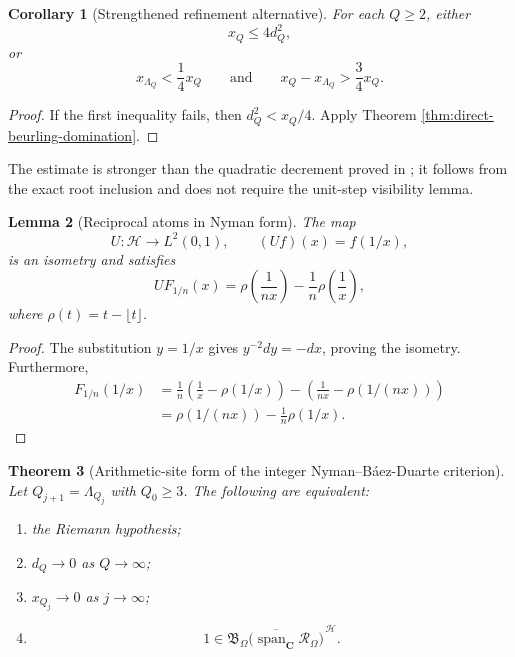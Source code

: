 \documentclass[11pt]{amsart}
\numberwithin{equation}{section}
\newtheorem{theorem}{Theorem}[section]
\newtheorem{corollary}[theorem]{Corollary}
\newtheorem{lemma}[theorem]{Lemma}
\theoremstyle{definition}
\newcommand{\C}{\mathbf C}
\newcommand{\cH}{\mathcal H}
\begin{document}
\begin{corollary}[Strengthened refinement alternative]
\label{cor:strong-refinement-alternative}
For each $Q\geq2$, either
\[
x_Q\leq4d_Q^2,
\]
or
\[
x_{\Lambda_Q}<\frac14x_Q
\qquad\text{and}\qquad
x_Q-x_{\Lambda_Q}>\frac34x_Q.
\]
\end{corollary}

\begin{proof}
If the first inequality fails, then $d_Q^2<x_Q/4$.  Apply Theorem
\ref{thm:direct-beurling-domination}.
\end{proof}

The estimate is stronger than the quadratic decrement proved in
\cite{Schultze}; it follows from the exact root inclusion and does not
require the unit-step visibility lemma.

\begin{lemma}[Reciprocal atoms in Nyman form]
\label{lem:nyman-form}
The map
\[
U:\cH\longrightarrow L^2(0,1),
\qquad
(Uf)(x)=f(1/x),
\]
is an isometry and satisfies
\[
UF_{1/n}(x)
=
\rho\!\left(\frac1{nx}\right)
-\frac1n\rho\!\left(\frac1x\right),
\]
where $\rho(t)=t-\lfloor t\rfloor$.
\end{lemma}

\begin{proof}
The substitution $y=1/x$ gives $y^{-2}dy=-dx$, proving the isometry.
Furthermore,
\[
\begin{aligned}
F_{1/n}(1/x)
&=\frac1n\left(\frac1x-\rho(1/x)\right)
 -\left(\frac1{nx}-\rho(1/(nx))\right)\\
&=\rho(1/(nx))-\frac1n\rho(1/x).
\end{aligned}
\]
\end{proof}

\begin{theorem}[Arithmetic-site form of the integer
Nyman--B\'aez-Duarte criterion]
\label{thm:arithmetic-site-nyman}
Let $Q_{j+1}=\Lambda_{Q_j}$ with $Q_0\geq3$.  The following are equivalent:
\begin{enumerate}[label=\textup{(\roman*)}]
\item the Riemann hypothesis;
\item $d_Q\to0$ as $Q\to\infty$;
\item $x_{Q_j}\to0$ as $j\to\infty$;
\item
\[
1\in
\overline{
\mathfrak B_\Omega
\bigl(\operatorname{span}_{\C}\mathscr R_\Omega\bigr)
}^{\,\cH}.
\]
\end{enumerate}
\end{theorem}
\end{document}
